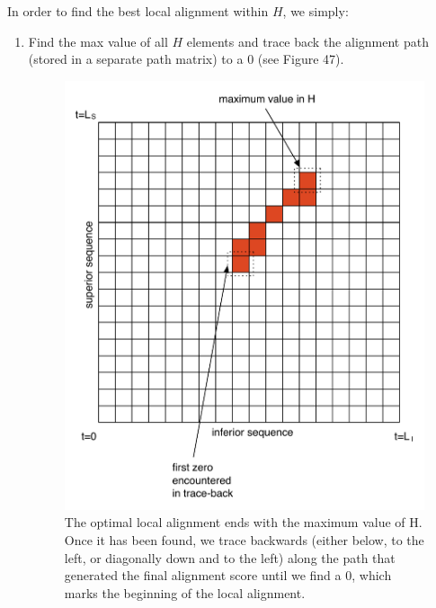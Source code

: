 \documentclass[12pt]{report} 	%
\numberwithin{figure}{chapter}
\numberwithin{table}{chapter}
\numberwithin{equation}{chapter}
\begin{document}
\begin{flushleft}
In order to find the best local alignment within $H$, we simply:
\begin{enumerate}
\item Find the max value of all $H$ elements and trace back the alignment path (stored in a separate path matrix) to a $0$ (see Figure 47).
\begin{figure}[h!]
\begin{center}
\includegraphics[scale=0.75]{SIC-DPLA_1}
\caption[Finding the optimal subsequence]{The optimal local alignment ends with the maximum value of H. Once it has been found, we trace backwards (either below, to the left, or diagonally down and to the left) along the path that generated the final alignment score until we find a $0$, which marks the beginning of the local alignment.}
\end{center}
\end{figure}


\end{enumerate}
\end{flushleft}
\end{document}
